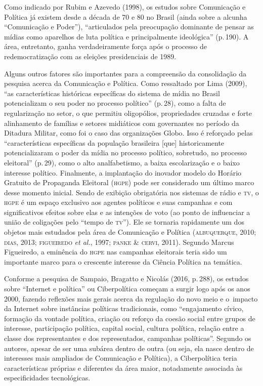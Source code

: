 Como indicado por Rubim e Azevedo (1998), os estudos sobre Comunicação e
Política já existem desde a década de 70 e 80 no Brasil (ainda sobre a
alcunha ``Comunicação e Poder''), ``articulados pela preocupação
dominante de pensar as mídias como aparelhos de luta política e
principalmente ideológica'' (p.\,190). A área, entretanto, ganha
verdadeiramente força após o processo de redemocratização com as
eleições presidenciais de 1989.

Alguns outros fatores são importantes para a compreensão da consolidação
da pesquisa acerca da Comunicação e Política. Como ressaltado por Lima
(2009), ``as características históricas específicas do sistema de mídia
no Brasil potencializam o seu poder no processo político'' (p.\,28), como
a falta de regularização no setor, o que permitiu oligopólios,
propriedades cruzadas e forte alinhamento de famílias e setores
midiáticos com governantes no período da Ditadura Militar, como foi o
caso das organizações Globo. Isso é reforçado pelas ``características
específicas da população brasileira {[}que{]} historicamente
potencializaram o poder da mídia no processo político, sobretudo, no
processo eleitoral'' (p.\,29), como o alto analfabetismo, a baixa
escolarização e o baixo interesse político. Finalmente, a implantação do
inovador modelo do Horário Gratuito de Propaganda Eleitoral (\textsc{hgpe}) pode
ser considerado um último marco desse momento inicial. Sendo de exibição
obrigatória nos sistemas de rádio e \textsc{tv}, o \textsc{hgpe} é um espaço exclusivo aos
agentes políticos e suas campanhas e com significativos efeitos sobre
elas e as intenções de voto (ao ponto de influenciar a união de
coligações pelo ``tempo de \textsc{tv}''). Ele se tornaria rapidamente um dos
objetos mais estudados pela área de Comunicação e Política (\textsc{albuquerque},
2010; \textsc{dias}, 2013; \textsc{figueiredo} \emph{et al.}, 1997; \textsc{panke \& cervi}, 2011).
Segundo Marcus Figueiredo, a eminência do \textsc{hgpe} nas campanhas eleitorais
teria sido um importante marco para o crescente interesse da Ciência
Política na temática.

Conforme a pesquisa de Sampaio, Bragatto e Nicolás (2016, p.\,288), os
estudos sobre ``Internet e política'' ou Ciberpolítica começam a surgir
logo após os anos 2000, fazendo reflexões mais gerais acerca da
regulação do novo meio e o~impacto da Internet sobre instâncias
políticas tradicionais, como ``engajamento cívico, formação da vontade
política, criação ou reforço da coesão social entre grupos de interesse,
participação política, capital social, cultura política, relação entre a
classe dos representantes e dos representados, campanhas políticas''.
Segundo os autores, apesar de ser uma subárea dentro de outra (ou seja,
ela nasce dentro de interesses mais ampliados de Comunicação e
Política), a Ciberpolítica teria características próprias e diferentes
da área maior, notadamente associada às especificidades tecnológicas.

